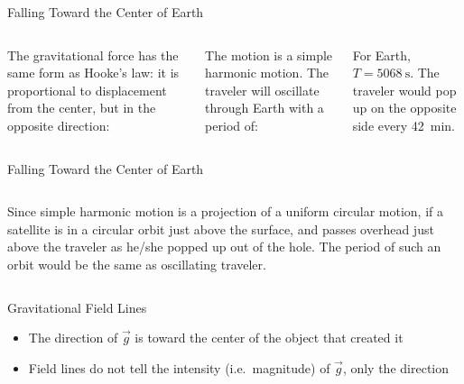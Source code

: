 \documentclass[12pt,compress,aspectratio=169]{beamer}
\begin{document}
\begin{frame}{Falling Toward the Center of Earth}
  \begin{columns}

    The gravitational force has the same form as Hooke's law: it is
    proportional to displacement from the center, but in the opposite
    direction:

    
    \vspace{-.1in}The motion is a simple harmonic motion. The traveler will
    oscillate through Earth with a period of:


    For Earth, $T=\SI{5068}\second$. The traveler would pop up on the opposite
    side every \SI{42}{min}.
  \end{columns}
\end{frame}




\begin{frame}{Falling Toward the Center of Earth}
  \begin{columns}

    Since simple harmonic motion is a projection of a uniform circular motion,
    if a satellite is in a circular orbit just above the surface, and passes
    overhead just above the traveler as he/she popped up out of the hole. The
    period of such an orbit would be the same as oscillating traveler.
  \end{columns}
\end{frame}



\begin{frame}{Gravitational Field Lines}
  \begin{center}
  \end{center}
  \begin{itemize}
  \item The direction of $\vec g$ is toward the center of the object that
    created it
  \item Field lines do not tell the intensity (i.e.\ magnitude) of $\vec g$,
    only the direction
  \end{itemize}
\end{frame}
\end{document}

